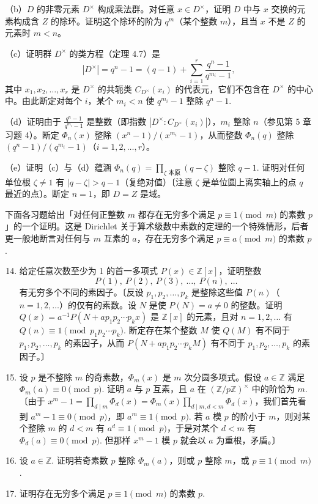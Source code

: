 \begin{enumerate}
（b）\(D\) 的非零元素 \(D^\times\) 构成乘法群。对任意 \(x \in D^\times\)，证明 \(D\) 中与 \(x\) 交换的元素构成含 \(Z\) 的除环。证明这个除环的阶为 \(q^m\)（某个整数 \(m\)），且当 \(x\) 不是 \(Z\) 的元素时 \(m < n\)。

（c）证明群 \(D^\times\) 的类方程（定理 4.7）是
\[
|D^\times| = q^n-1 = (q-1)+\sum_{i=1}^{r}\frac{q^n-1}{q^{m_i}-1},
\]
其中 \(x_1, x_2, \ldots, x_r\) 是 \(D^\times\) 的共轭类 \(C_{D^\times}(x_i)\) 的代表元，它们不包含在 \(D^\times\) 的中心中。由此断定对每个 \(i\)，某个 \(m_i < n\) 使 \(q^{m_i}-1\) 整除 \(q^n-1\).

（d）证明由于 \(\frac{q^n-1}{q^{m_i}-1}\) 是整数（即指数 \(|D^\times : C_{D^\times}(x_i)|\)），\(m_i\) 整除 \(n\)（参见第 5 章习题 4）。断定 \(\Phi_n(x)\) 整除 \((x^n-1)/(x^{m_i}-1)\)，从而整数 \(\Phi_n(q)\) 整除 \((q^n-1)/(q^{m_i}-1)\)（\(i = 1, 2, \ldots, r\)）。

（e）证明（c）与（d）蕴涵 \(\Phi_n(q) = \prod_{\zeta \text{ 本原}}(q-\zeta)\) 整除 \(q-1\). 证明对任何单位根 \(\zeta \neq 1\) 有 \(|q-\zeta| > q-1\)（复绝对值）〔注意 \(\zeta\) 是单位圆上离实轴上的点 \(q\) 最近的点〕。断定 \(n = 1\)，即 \(D = Z\) 是域。
\end{enumerate}

\noindent 下面各习题给出「对任何正整数 \(m\) 都存在无穷多个满足 \(p \equiv 1 \pmod m\) 的素数 \(p\)」的一个证明。这是 Dirichlet 关于算术级数中素数的定理的一个特殊情形，后者更一般地断言对任何与 \(m\) 互素的 \(a\)，存在无穷多个满足 \(p \equiv a \pmod m\) 的素数 \(p\).

\begin{enumerate}
\setcounter{enumi}{13}
\item 给定任意次数至少为 1 的首一多项式 \(P(x) \in \mathbb{Z}[x]\)，证明整数
\[
P(1),\ P(2),\ P(3),\ \ldots,\ P(n),\ \ldots
\]
有无穷多个不同的素因子。〔反设 \(p_1, p_2, \ldots, p_k\) 是整除这些值 \(P(n)\)（\(n = 1, 2, \ldots\)）的仅有的素数。设 \(N\) 是使 \(P(N) = a \neq 0\) 的整数。证明 \(Q(x) = a^{-1}P(N+ap_1p_2\cdots p_kx)\) 是 \(\mathbb{Z}[x]\) 的元素，且对 \(n = 1, 2, \ldots\) 有 \(Q(n) \equiv 1 \pmod{p_1p_2\cdots p_k}\). 断定存在某个整数 \(M\) 使 \(Q(M)\) 有不同于 \(p_1, p_2, \ldots, p_k\) 的素因子，从而 \(P(N+ap_1p_2\cdots p_kM)\) 有不同于 \(p_1, p_2, \ldots, p_k\) 的素因子。〕

\item 设 \(p\) 是不整除 \(m\) 的奇素数，\(\Phi_m(x)\) 是 \(m\) 次分圆多项式。假设 \(a \in \mathbb{Z}\) 满足 \(\Phi_m(a) \equiv 0 \pmod p\). 证明 \(a\) 与 \(p\) 互素，且 \(a\) 在 \((\mathbb{Z}/p\mathbb{Z})^\times\) 中的阶恰为 \(m\).〔由于 \(x^m-1 = \prod_{d \mid m}\Phi_d(x) = \Phi_m(x)\prod_{d \mid m, d < m}\Phi_d(x)\)，我们首先看到 \(a^m-1 \equiv 0 \pmod p\)，即 \(a^m \equiv 1 \pmod p\). 若 \(a\) 模 \(p\) 的阶小于 \(m\)，则对某个整除 \(m\) 的 \(d < m\) 有 \(a^d \equiv 1 \pmod p\)，于是对某个 \(d < m\) 有 \(\Phi_d(a) \equiv 0 \pmod p\). 但那样 \(x^m-1\) 模 \(p\) 就会以 \(a\) 为重根，矛盾。〕

\item 设 \(a \in \mathbb{Z}\). 证明若奇素数 \(p\) 整除 \(\Phi_m(a)\)，则或 \(p\) 整除 \(m\)，或 \(p \equiv 1 \pmod m\).

\item 证明存在无穷多个满足 \(p \equiv 1 \pmod m\) 的素数 \(p\).
\end{enumerate}
